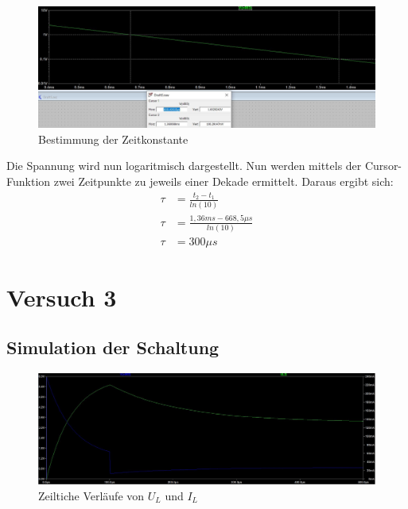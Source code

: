 \documentclass{article}
\begin{document}
\begin{figure}[h]
  \begin{center}
    \includegraphics[scale=0.5]{../assets/images/ET2P5/tau log aufgabe 2.JPG}
    \caption{Bestimmung der Zeitkonstante}
  \end{center}
\end{figure}
Die Spannung wird nun logaritmisch dargestellt. Nun werden mittels der Cursor-Funktion zwei Zeitpunkte zu jeweils einer Dekade ermittelt.
Daraus ergibt sich:
\begin{align*}
  \tau &= \frac{t_2-t_1}{ln(10)}\\
  \tau &= \frac{1,36ms - 668,5\mu s}{ln (10)}\\
  \tau &= 300\mu s
\end{align*}


\newpage


\section{Versuch 3}
\subsection{Simulation der Schaltung}
\begin{figure}[h]
  \begin{center}
    \includegraphics[scale=0.4]{../assets/images/ET2P5/aufgabe 3 u von t und i von t.JPG}
    \caption{Zeiltiche Verläufe von $U_L$ und $I_L$}
  \end{center}
\end{figure}
\end{document}
